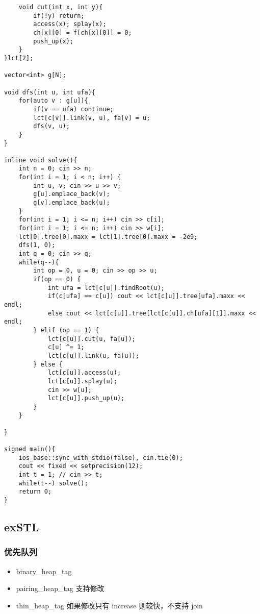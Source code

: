 \documentclass[]{article}
\providecommand{\tightlist}{%
  \setlength{\itemsep}{0pt}\setlength{\parskip}{0pt}}
\begin{document}
\begin{verbatim}
    void cut(int x, int y){
        if(!y) return;
        access(x); splay(x);
        ch[x][0] = f[ch[x][0]] = 0;
        push_up(x);
    }
}lct[2];

vector<int> g[N];

void dfs(int u, int ufa){
    for(auto v : g[u]){
        if(v == ufa) continue;
        lct[c[v]].link(v, u), fa[v] = u;
        dfs(v, u);
    }
}

inline void solve(){
    int n = 0; cin >> n;
    for(int i = 1; i < n; i++) {
        int u, v; cin >> u >> v;
        g[u].emplace_back(v);
        g[v].emplace_back(u);
    }
    for(int i = 1; i <= n; i++) cin >> c[i];
    for(int i = 1; i <= n; i++) cin >> w[i];
    lct[0].tree[0].maxx = lct[1].tree[0].maxx = -2e9;
    dfs(1, 0);
    int q = 0; cin >> q;
    while(q--){
        int op = 0, u = 0; cin >> op >> u;
        if(op == 0) {
            int ufa = lct[c[u]].findRoot(u);
            if(c[ufa] == c[u]) cout << lct[c[u]].tree[ufa].maxx << endl;
            else cout << lct[c[u]].tree[lct[c[u]].ch[ufa][1]].maxx << endl;
        } elif (op == 1) {
            lct[c[u]].cut(u, fa[u]);
            c[u] ^= 1;
            lct[c[u]].link(u, fa[u]);
        } else {
            lct[c[u]].access(u);
            lct[c[u]].splay(u);
            cin >> w[u];
            lct[c[u]].push_up(u);
        }
    }

}

signed main(){
    ios_base::sync_with_stdio(false), cin.tie(0);
    cout << fixed << setprecision(12);
    int t = 1; // cin >> t;
    while(t--) solve();
    return 0;
}
\end{verbatim}

\hypertarget{exstl}{%
\subsection{exSTL}\label{exstl}}

\hypertarget{ux4f18ux5148ux961fux5217}{%
\subsubsection{优先队列}\label{ux4f18ux5148ux961fux5217}}

\begin{itemize}
\tightlist
\item
  binary\_heap\_tag
\item
  pairing\_heap\_tag 支持修改
\item
  thin\_heap\_tag 如果修改只有 increase 则较快，不支持 join
\end{itemize}
\end{document}
